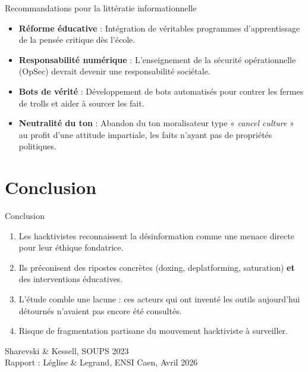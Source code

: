 \documentclass[10pt, french]{beamer}
\begin{document}
\begin{frame}{Recommandations pour la littératie informationnelle}
\begin{itemize}
	\item \textbf{Réforme éducative} : Intégration de véritables programmes d'apprentissage de la pensée critique dès l'école.
	\item \textbf{Responsabilité numérique} : L'enseignement de la sécurité opérationnelle (OpSec) devrait devenir une responsabilité sociétale.
	\item \textbf{Bots de vérité} : Développement de bots automatisés pour contrer les fermes de trolls et aider à sourcer les fait.
	\item \textbf{Neutralité du ton} : Abandon du ton moralisateur type « \textit{cancel culture} » au profit d'une attitude impartiale, les faits n'ayant pas de propriétés politiques.
\end{itemize}
\end{frame}

\section{Conclusion}
\begin{frame}{Conclusion}
\begin{enumerate}
  \item Les hacktivistes reconnaissent la désinformation comme une menace directe pour leur éthique fondatrice.
  \item Ils préconisent des ripostes concrètes (doxing, deplatforming, saturation) \textbf{et} des interventions éducatives.
  \item L'étude comble une lacune : ces acteurs qui ont inventé les outils aujourd'hui détournés n'avaient pas encore été consultés.
  \item Risque de fragmentation partisane du mouvement hacktiviste à surveiller.
\end{enumerate}
\vspace{0.5cm}
\centering
\small Sharevski \& Kessell, SOUPS 2023 \\
Rapport : Léglise \& Legrand, ENSI Caen, Avril 2026
\end{frame}
\end{document}
